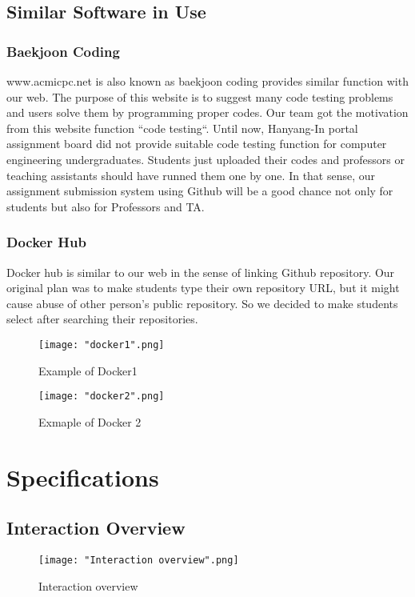 \documentclass[10pt,journal,compsoc]{IEEEtran}
\begin{document}
\subsection{Similar Software in Use\\}
\subsubsection{Baekjoon Coding} 
www.acmicpc.net is also known as baekjoon coding provides similar function with our web. The purpose of this website is to suggest many code testing problems and users solve them by programming proper codes. Our team got the motivation from this website function “code testing“. Until now, Hanyang-In portal assignment board did not provide suitable code testing function for computer engineering undergraduates. Students just uploaded their codes and professors or teaching assistants should have runned them one by one. In that sense, our assignment submission system using Github will be a good chance not only for students but also for Professors and TA.

\subsubsection{Docker Hub} 
Docker hub is similar to our web in the sense of linking Github repository. Our original plan was to make students type their own repository URL, but it might cause abuse of other person’s public repository. So we decided to make students select after searching their repositories. 
\begin{figure}[H]
\centering
\texttt{[image: "docker1".png]}
{\caption*{Example of Docker1}}
\end{figure}

\begin{figure}[H]
\centering
\texttt{[image: "docker2".png]}
{\caption*{Exmaple of Docker 2}}
\end{figure}

\clearpage
\ifCLASSOPTIONcompsoc
{}
\else
\section{Specifications}
\label{sec:Specifications}
\fi
\subsection{Interaction Overview}
\begin{figure}[H]
\centering
\texttt{[image: "Interaction overview".png]}
{\caption*{Interaction overview}}
\end{figure}
\end{document}
